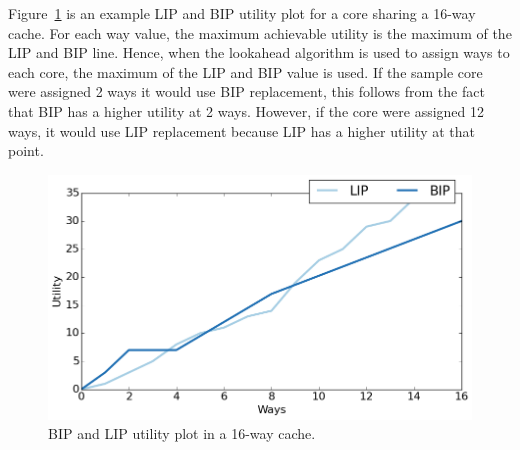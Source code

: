 Figure~\ref{fig:algorithms:clu_example} is an example LIP and BIP utility plot for a core sharing a 16-way cache.
For each way value, the maximum achievable utility is the maximum of the LIP and BIP line.
Hence, when the lookahead algorithm is used to assign ways to each core, the maximum of the LIP and BIP value is used.
If the sample core were assigned 2 ways it would use BIP replacement, this follows from the fact that BIP has a higher utility at 2 ways.
However, if the core were assigned 12 ways, it would use LIP replacement because LIP has a higher utility at that point.

\begin{figure}[ht]
    \centering
    \includegraphics[width=.65\textwidth]{figures/algorithms/clu-utility}
    \caption{BIP and LIP utility plot in a 16-way cache.}
    \label{fig:algorithms:clu_example}
\end{figure}
